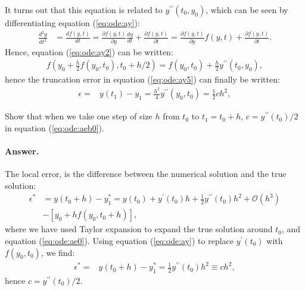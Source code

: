 \documentclass[graybox,sectrefs,envcountresetchap,open=right,final]{svmonodo}
\newenvironment{doconceexercise}{}{}
\begin{document}
\begin{doconceexercise}
It turns out that this equation is related to $y^{\prime\prime}(t_0,y_0)$, which can be seen by differentiating equation (\ref{eq:ode:ay}):
\begin{align}
\frac{d^2y}{dt^2}&=\frac{df(y,t)}{dt}=\frac{\partial f(y,t)}{\partial y}\frac{dy}{dt}+\frac{\partial f(y,t)}{\partial t}
=\frac{\partial f(y,t)}{\partial y}f(y,t)+\frac{\partial f(y,t)}{\partial t}.\label{eq:ode:ay3}
\end{align}
Hence, equation (\ref{eq:ode:ay2}) can be written:
\begin{align}
f(y_0+\frac{h}{2}f(y_0,t_0),t_0+h/2)=f(y_0,t_0)+\frac{h}{2}y^{\prime\prime}(t_0,y_0),\label{eq:ode:ay4}
\end{align}
hence the truncation error in equation (\ref{eq:ode:ay5}) can finally be written:
\begin{align}
\epsilon=&y(t_1)-y_{1}=\frac{h^2}{4} y^{\prime\prime}(y_0,t_0)=\frac{1}{2}ch^2,\label{eq:ode:ae4}
\end{align}



Show that when we take one step of size $h$ from $t_0$ to $t_1=t_0+h$, $c=y^{\prime\prime}(t_0)/2$ in equation (\ref{eq:ode:aeb0}).

\paragraph{Answer.}
The local error, is the difference between the numerical solution and the true solution:
\begin{align}
\epsilon^*&=y(t_0+h)-y_{1}^*=y(t_0)+y^{\prime}(t_0)h+\frac{1}{2}y^{\prime\prime}(t_0)h^2+\mathcal{O}(h^3)\nonumber\\ 
&-\left[y_0+hf(y_0,t_0+h)\right],
\end{align}
where we have used Taylor expansion to expand the true solution around $t_0$, and equation (\ref{eq:ode:ae0}).
Using equation (\ref{eq:ode:ay}) to replace $y^\prime(t_0)$ with $f(y_0,t_0)$, we find:
\begin{align}
\epsilon^*=&y(t_0+h)-y_{1}^*=\frac{1}{2}y^{\prime\prime}(t_0)h^2\equiv ch^2,
\end{align}
hence $c=y^{\prime\prime}(t_0)/2$.




\end{doconceexercise}
\end{document}
